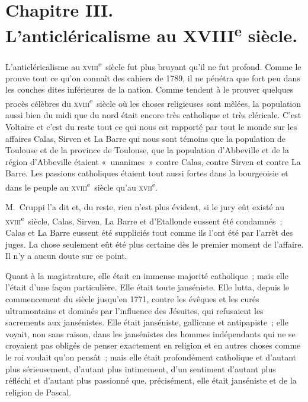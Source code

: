 \documentclass[french,twoside]{book} %
\begin{document}
 \section[{Chapitre III. L’anticléricalisme au XVIIIe siècle.}]{Chapitre III.\\
L’anticléricalisme au XVIII\textsuperscript{e} siècle.}\renewcommand{\leftmark}{Chapitre III.\\
L’anticléricalisme au XVIII\textsuperscript{e} siècle.}

\noindent L’anticléricalisme au \textsc{xviii}\textsuperscript{e} siècle fut plus bruyant qu’il ne fut profond. Comme le prouve tout ce qu’on connaît des cahiers de 1789, il ne pénétra que fort peu dans les couches dites inférieures de la nation. Comme tendent à le prouver quelques procès célèbres du \textsc{xviii}\textsuperscript{e} siècle où les choses religieuses sont mêlées, la population aussi bien du midi que du nord était encore très catholique et très cléricale. C’est Voltaire et c’est du reste tout ce qui nous est rapporté par tout le monde sur les affaires Calas, Sirven et La Barre qui nous sont témoins que la population de Toulouse et de la province de Toulouse, que la population d’Abbeville et de la région d’Abbeville étaient « unanimes » contre Calas, contre Sirven et contre La Barre. Les passions catholiques étaient tout aussi fortes dans la bourgeoisie et dans le peuple au \textsc{xviii}\textsuperscript{e} siècle qu’au \textsc{xvii}\textsuperscript{e}.\par
 M. Cruppi l’a dit et, du reste, rien n’est plus évident, si le jury eût existé au \textsc{xviii}\textsuperscript{e} siècle, Calas, Sirven, La Barre et d’Etallonde eussent été condamnés ; Calas et La Barre eussent été suppliciés tout comme ils l’ont été par l’arrêt des juges. La chose seulement eût été plus certaine dès le premier moment de l’affaire. Il n’y a aucun doute sur ce point.\par
Quant à la magistrature, elle était en immense majorité catholique ; mais elle l’était d’une façon particulière. Elle était toute janséniste. Elle lutta, depuis le commencement du siècle jusqu’en 1771, contre les évêques et les curés ultramontains et dominés par l’influence des Jésuites, qui refusaient les sacrements aux jansénistes. Elle était janséniste, gallicane et antipapiste ; elle voyait, non sans raison, dans les jansénistes des hommes indépendants qui ne se croyaient pas obligés de penser exactement en religion et en autres choses comme le roi voulait qu’on pensât ; mais elle était profondément catholique et d’autant plus sérieusement, d’autant plus intimement, d’un sentiment d’autant plus réfléchi et d’autant plus passionné que, précisément, elle était janséniste et de la religion de Pascal.\par
\end{document}
